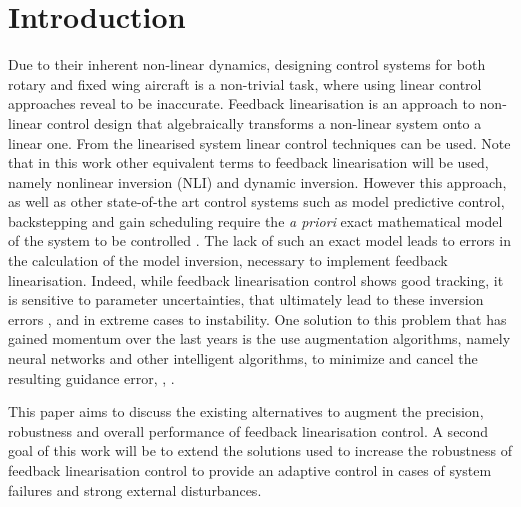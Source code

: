 
\chapter{Introduction}
\label{chapter:introduction}


Due to their inherent non-linear dynamics, designing control systems for both rotary and fixed wing aircraft is a non-trivial task, where using linear control approaches reveal to be inaccurate. Feedback linearisation is an approach to non-linear control design that algebraically transforms a non-linear system onto a linear one. From the linearised system linear control techniques can be used. Note that in this work other equivalent terms to feedback linearisation will be used, namely nonlinear inversion (NLI) and dynamic inversion. 
However this approach, as well as other state-of-the art control systems such as model predictive control, backstepping and gain scheduling require the \textit{a priori} exact mathematical model of the system to be controlled \cite{SotA_IFCS}. The lack of such an exact model leads to errors in the calculation of the model inversion, necessary to implement feedback linearisation. Indeed, while feedback linearisation control shows good tracking, it is sensitive to parameter uncertainties, that ultimately lead to these inversion errors \cite{SotA_ControlAlgorithm}, and in extreme cases to instability. One solution to this problem that has gained momentum over the last years is the use augmentation algorithms, namely neural networks and other intelligent algorithms, to minimize and cancel the resulting guidance error\cite{NLI+NN}, \cite{NLI+NN_IFCS}, \cite{NLI+NN_chinese}. 

This paper aims to discuss the existing alternatives to augment the precision, robustness and overall performance of feedback linearisation control. A second goal of this work will be to extend the solutions used to increase the robustness of feedback linearisation control to provide an adaptive control in cases of system failures and strong external disturbances.



